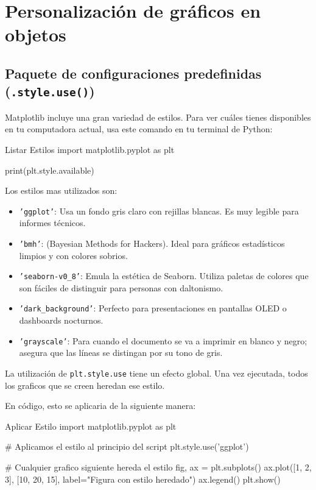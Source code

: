 \section{Personalización de gráficos en objetos}

\subsection{Paquete de configuraciones predefinidas (\texttt{.style.use()})}

Matplotlib incluye una gran variedad de estilos. Para ver cuáles tienes disponibles en tu computadora actual, usa este comando en tu terminal de Python:

\begin{pycode}{Listar Estilos}
import matplotlib.pyplot as plt

print(plt.style.available)
\end{pycode}

Los estilos mas utilizados son:
\begin{itemize}
    \item \texttt{'ggplot'}: Usa un fondo gris claro con rejillas blancas. Es muy legible para informes técnicos.
    \item \texttt{'bmh'}: (Bayesian Methods for Hackers). Ideal para gráficos estadísticos limpios y con colores sobrios.
    \item \texttt{'seaborn-v0\_8'}: Emula la estética de Seaborn. Utiliza paletas de colores que son fáciles de distinguir para personas con daltonismo.
    \item \texttt{'dark\_background'}: Perfecto para presentaciones en pantallas OLED o dashboards nocturnos.
    \item \texttt{'grayscale'}: Para cuando el documento se va a imprimir en blanco y negro; asegura que las líneas se distingan por su tono de gris.
\end{itemize}

La utilización de \texttt{plt.style.use} tiene un efecto global. Una vez ejecutada, todos los graficos que se creen heredan ese estilo.

En código, esto se aplicaria de la siguiente manera:
\begin{pycode}{Aplicar Estilo}
import matplotlib.pyplot as plt

# Aplicamos el estilo al principio del script
plt.style.use('ggplot')

# Cualquier grafico siguiente hereda el estilo
fig, ax = plt.subplots()
ax.plot([1, 2, 3], [10, 20, 15], label="Figura con estilo heredado")
ax.legend()
plt.show()
\end{pycode}


